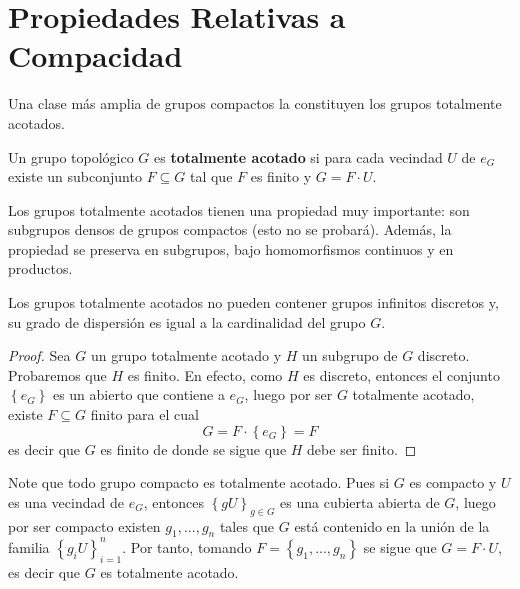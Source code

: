 \documentclass[12pt]{report}
\theoremstyle{largebreak}
\begin{document}
    \section{Propiedades Relativas a Compacidad}

    Una clase más amplia de grupos compactos la constituyen los grupos totalmente acotados.

    \begin{mydef}
        Un grupo topológico $G$ es \textbf{totalmente acotado} si para cada vecindad $U$ de $e_G$ existe un subconjunto $F\subseteq G$ tal que $F$ es finito y $G=F\cdot U$.
    \end{mydef}

    Los grupos totalmente acotados tienen una propiedad muy importante: son subgrupos densos de grupos compactos (esto no se probará). Además, la propiedad se preserva en subgrupos, bajo homomorfismos continuos y en productos.

    \begin{obs}
        Los grupos totalmente acotados no pueden contener grupos infinitos discretos y, su grado de dispersión es igual a la cardinalidad del grupo $G$.
    \end{obs}

    \begin{proof}
        Sea $G$ un grupo totalmente acotado y $H$ un subgrupo de $G$ discreto. Probaremos que $H$ es finito. En efecto, como $H$ es discreto, entonces el conjunto $\left\{e_G\right\}$ es un abierto que contiene a $e_G$, luego por ser $G$ totalmente acotado, existe $F\subseteq G$ finito para el cual
        \begin{equation*}
            G=F\cdot\left\{e_G\right\}=F
        \end{equation*}
        es decir que $G$ es finito de donde se sigue que $H$ debe ser finito.
    \end{proof}

    Note que todo grupo compacto es totalmente acotado. Pues si $G$ es compacto y $U$ es una vecindad de $e_G$, entonces $\left\{gU \right\}_{ g\in G}$ es una cubierta abierta de $G$, luego por ser compacto existen $g_1,...,g_n$ tales que $G$ está contenido en la unión de la familia $\left\{g_iU \right\}_{ i=1}^n$. Por tanto, tomando $F=\left\{g_1,...,g_n \right\}$ se sigue que $G=F\cdot U$, es decir que $G$ es totalmente acotado.

    \renewcommand{\theenumi}{\roman{enumi}}
\end{document}
